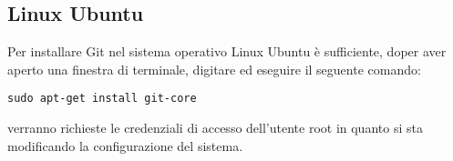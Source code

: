 \subsection{Linux Ubuntu}
Per installare Git nel sistema operativo Linux Ubuntu è sufficiente, doper aver aperto una finestra di terminale, digitare ed eseguire il seguente comando:

\begin{center}
\texttt{sudo apt-get install git-core}
\end{center}

verranno richieste le credenziali di accesso dell'utente root in quanto si sta modificando la configurazione del sistema.